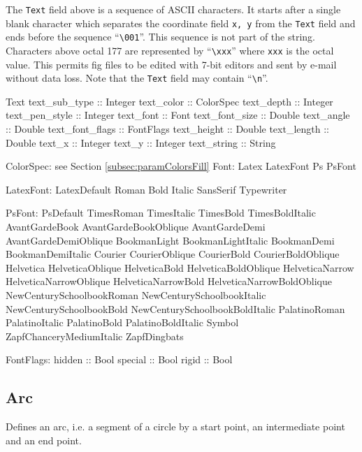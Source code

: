 \documentclass[10pt, a4paper]{article}
\begin{document}
The {\tt Text} field above is a sequence of ASCII characters. 
It starts after a single blank character 
which separates the coordinate field {\tt x, y} from the {\tt Text} field 
and ends before the sequence ``{\tt\textbackslash 001}''. 
This sequence is not part of the string. 
Characters above octal 177 are represented by ``{\tt\textbackslash xxx}'' 
where {\tt xxx} is the octal value. 
This permits fig files to be edited with 7-bit editors 
and sent by e-mail without data loss. 
Note that the {\tt Text} field may contain ``{\tt\textbackslash n}''. 


Text	 
text\_sub\_type :: Integer
text\_color :: ColorSpec
text\_depth :: Integer
text\_pen\_style :: Integer
text\_font :: Font
text\_font\_size :: Double
text\_angle :: Double
text\_font\_flags :: FontFlags
text\_height :: Double
text\_length :: Double
text\_x :: Integer
text\_y :: Integer
text\_string :: String

ColorSpec: see Section \ref{subsec:paramColorsFill}
Font:
Latex LatexFont	 
Ps PsFont	 


LatexFont:
LatexDefault	 
Roman	 
Bold	 
Italic	 
SansSerif	 
Typewriter	 


PsFont:
PsDefault	 
TimesRoman	 
TimesItalic	 
TimesBold	 
TimesBoldItalic	 
AvantGardeBook	 
AvantGardeBookOblique	 
AvantGardeDemi	 
AvantGardeDemiOblique	 
BookmanLight	 
BookmanLightItalic	 
BookmanDemi	 
BookmanDemiItalic	 
Courier	 
CourierOblique	 
CourierBold	 
CourierBoldOblique	 
Helvetica	 
HelveticaOblique	 
HelveticaBold	 
HelveticaBoldOblique	 
HelveticaNarrow	 
HelveticaNarrowOblique	 
HelveticaNarrowBold	 
HelveticaNarrowBoldOblique	 
NewCenturySchoolbookRoman	 
NewCenturySchoolbookItalic	 
NewCenturySchoolbookBold	 
NewCenturySchoolbookBoldItalic	 
PalatinoRoman	 
PalatinoItalic	 
PalatinoBold	 
PalatinoBoldItalic	 
Symbol	 
ZapfChanceryMediumItalic	 
ZapfDingbats	 


FontFlags:
hidden :: Bool
special :: Bool
rigid :: Bool





\subsection{Arc}\label{subsec:arc}

Defines an arc, i.e. a segment of a circle by a start point, 
an intermediate point and an end point. 
\end{document}
